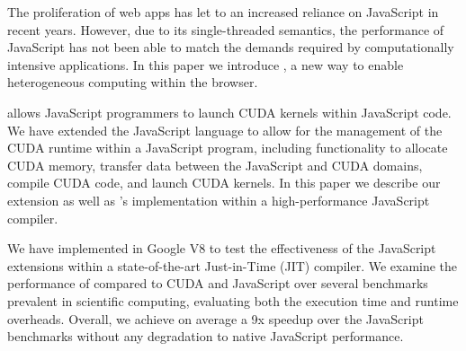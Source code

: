 
The proliferation of web apps has let to an increased reliance on JavaScript in
recent years. However, due to its single-threaded semantics, the performance of
JavaScript has not been able to match the demands required by computationally
intensive applications. In this paper we introduce \namens, a new way to enable
heterogeneous computing within the browser.

\name allows JavaScript programmers to launch CUDA kernels within JavaScript
code. We have extended the JavaScript language to allow for the management of
the CUDA runtime within a JavaScript program, including functionality to
allocate CUDA memory, transfer data between the JavaScript and CUDA domains,
compile CUDA code, and launch CUDA kernels. In this paper we describe our
extension as well as \namens's implementation within a high-performance
JavaScript compiler.

We have implemented \name in Google V8 to test the
effectiveness of the JavaScript extensions within a state-of-the-art
Just-in-Time (JIT) compiler. We examine the performance of \name compared to
CUDA and JavaScript over several benchmarks prevalent in scientific computing,
evaluating both the execution time and runtime overheads.  Overall, we achieve
on average a 9x speedup over the JavaScript benchmarks without any degradation
to native JavaScript performance.

